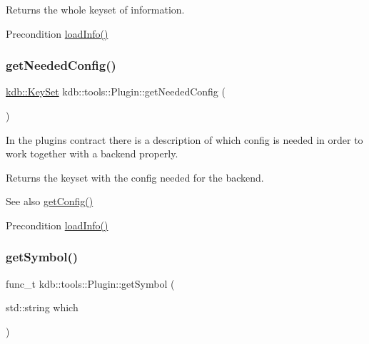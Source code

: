 Returns the whole keyset of information. 

\begin{DoxyPrecond}{Precondition}
\hyperlink{classkdb_1_1tools_1_1Plugin_a3a0c6a956d1714002ef9baf8c9d99167}{load\+Info()} 
\end{DoxyPrecond}
\mbox{\label{classkdb_1_1tools_1_1Plugin_ad2a0a4a64d17c479e7cd8b1402275cc7}} 
\subsubsection{\texorpdfstring{get\+Needed\+Config()}{getNeededConfig()}}
{\footnotesize\ttfamily \hyperlink{classkdb_1_1KeySet}{kdb\+::\+Key\+Set} kdb\+::tools\+::\+Plugin\+::get\+Needed\+Config (\begin{DoxyParamCaption}{ }\end{DoxyParamCaption})}



In the plugin\textquotesingle{}s contract there is a description of which config is needed in order to work together with a backend properly. 

\begin{DoxyReturn}{Returns}
the keyset with the config needed for the backend. 
\end{DoxyReturn}
\begin{DoxySeeAlso}{See also}
\hyperlink{classkdb_1_1tools_1_1Plugin_af3004444f5ef05dc8106646ff2b95694}{get\+Config()} 
\end{DoxySeeAlso}
\begin{DoxyPrecond}{Precondition}
\hyperlink{classkdb_1_1tools_1_1Plugin_a3a0c6a956d1714002ef9baf8c9d99167}{load\+Info()} 
\end{DoxyPrecond}
\mbox{\label{classkdb_1_1tools_1_1Plugin_aca31140802ab463d5bddd95dee73194d}} 
\subsubsection{\texorpdfstring{get\+Symbol()}{getSymbol()}}
{\footnotesize\ttfamily func\+\_\+t kdb\+::tools\+::\+Plugin\+::get\+Symbol (\begin{DoxyParamCaption}\item[{std\+::string}]{which }\end{DoxyParamCaption})\hspace{0.3cm}{\ttfamily [inline]}}



